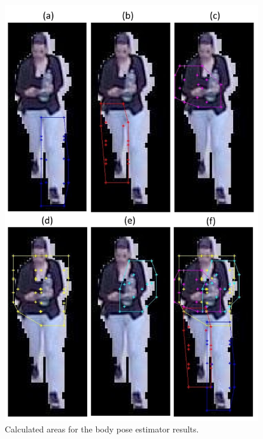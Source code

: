 \documentclass[titlepage,12pt,a4paper,times]{book}
\begin{document}
\begin{figure}[!h]
\centering
\includegraphics[scale=0.63]{images/3_3_fig3_first.jpg}
\caption{Calculated areas for the body pose estimator results.}
\label{fig:cach}
\end{figure}
\FloatBarrier
\end{document}
